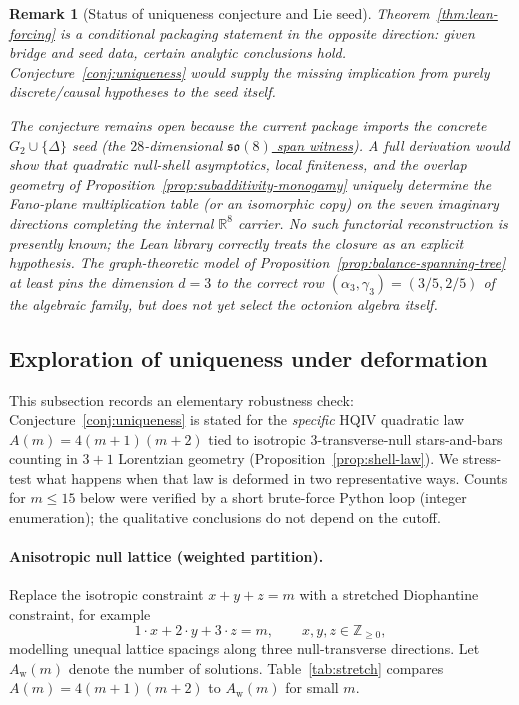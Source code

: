 \documentclass[11pt]{amsart}
\newtheorem{remark}[theorem]{Remark}
\begin{document}
\begin{remark}[Status of uniqueness conjecture and Lie seed]
Theorem~\ref{thm:lean-forcing} is a \emph{conditional} packaging statement in the opposite direction: given bridge and seed data, certain analytic conclusions hold. Conjecture~\ref{conj:uniqueness} would supply the missing implication from purely discrete/causal hypotheses to the seed itself.

The conjecture remains open because the current package imports the concrete \(G_2\cup\{\Delta\}\) seed (the \(28\)-dimensional \hyperref[lean:so8-witness]{\(\mathfrak{so}(8)\) span witness}). A full derivation would show that quadratic null-shell asymptotics, local finiteness, and the overlap geometry of Proposition~\ref{prop:subadditivity-monogamy} uniquely determine the Fano-plane multiplication table (or an isomorphic copy) on the seven imaginary directions completing the internal \(\mathbb{R}^8\) carrier. No such functorial reconstruction is presently known; the Lean library correctly treats the closure as an explicit hypothesis. The graph-theoretic model of Proposition~\ref{prop:balance-spanning-tree} at least pins the dimension \(d=3\) to the correct row \((\alpha_3,\gamma_3)=(3/5,2/5)\) of the algebraic family, but does not yet select the octonion algebra itself.
\end{remark}

\subsection{Exploration of uniqueness under deformation}
\label{subsec:uniqueness-deformation}

This subsection records an elementary robustness check: Conjecture~\ref{conj:uniqueness} is stated for the \emph{specific} HQIV quadratic law \(A(m)=4(m+1)(m+2)\) tied to isotropic \(3\)-transverse-null stars-and-bars counting in \(3{+}1\) Lorentzian geometry (Proposition~\ref{prop:shell-law}). We stress-test what happens when that law is deformed in two representative ways. Counts for \(m\le 15\) below were verified by a short brute-force Python loop (integer enumeration); the qualitative conclusions do not depend on the cutoff.

\paragraph{Anisotropic null lattice (weighted partition).}
Replace the isotropic constraint \(x+y+z=m\) with a stretched Diophantine constraint, for example
\[
1\cdot x+2\cdot y+3\cdot z=m,\qquad x,y,z\in\mathbb{Z}_{\ge 0},
\]
modelling unequal lattice spacings along three null-transverse directions. Let \(A_{\mathrm{w}}(m)\) denote the number of solutions. Table~\ref{tab:stretch} compares \(A(m)=4(m+1)(m+2)\) to \(A_{\mathrm{w}}(m)\) for small \(m\).
\end{document}
